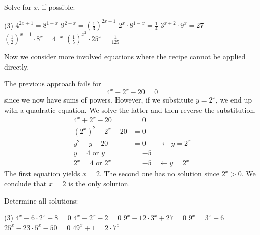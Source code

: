 \begin{exercise}
	Solve for $x$, if possible:
	\begin{tasks}(3)
		\task $4^{2x+1}=8^{1-x}$
		\task $9^{2-x}=\left(\frac{1}{3}\right)^{2x+1}$
		\task $2^x\cdot 8^{1-x}=\frac{1}{4}$
		\task $3^{x+2}\cdot 9^x=27$
		\task $\left(\frac{1}{2}\right)^{x-1}\cdot 8^x=4^{-x}$
		\task $\left(\frac{1}{5}\right)^{x^2}\cdot 25^x=\frac{1}{125}$
	\end{tasks}
\end{exercise}
Now we consider more involved equations where the recipe cannot be applied directly.
\begin{example*}
	The previous approach fails for
	\begin{equation*}
		4^x+2^x-20=0
	\end{equation*}
	since we now have sums of powers. However, if we substitute $y=2^x$, we end up with a quadratic equation. We solve the latter and then reverse the substitution.
	\begin{align*}
		4^x+2^x-20&=0\\
		\left(2^x\right)^2+2^x-20&=0\\
		y^2+y-20&=0\quad\quad\leftarrow y=2^x\\
		y=4\text{ or }y&=-5\\
		2^x=4\text{ or }2^x&=-5\quad\leftarrow y=2^x
	\end{align*}
	The first equation yields $x=2$. The second one has no solution since $2^x>0$.
	We conclude that $x=2$ is the only solution.
\end{example*}

\begin{exercise}
	Determine all solutions:
	\begin{tasks}(3)
		\task $4^x-6\cdot 2^x+8=0$
		\task $4^x-2^x-2=0$
		\task $9^x-12\cdot 3^x+27=0$
		\task $9^x=3^x+6$
		\task $25^x-23\cdot 5^x-50=0$
		\task $49^x+1=2\cdot 7^x$
	\end{tasks}
\end{exercise}